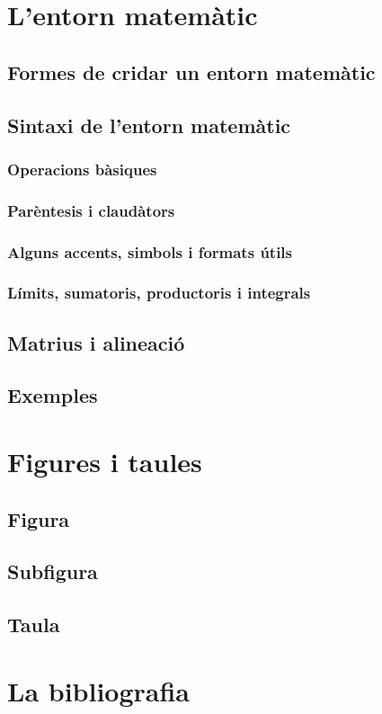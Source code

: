 \documentclass[15pt,twosides,onecolumn,openany]{book}
\begin{document}
\chapter{L'entorn matemàtic}
\section{Formes de cridar un entorn matemàtic}
\section{Sintaxi de l'entorn matemàtic}
\subsection{Operacions bàsiques}
\subsection{Parèntesis i claudàtors}
\subsection{Alguns accents, simbols i formats útils}
\subsection{Límits, sumatoris, productoris i integrals}
\section{Matrius i alineació}
\section{Exemples}

\chapter{Figures i taules}
\section{Figura}
\section{Subfigura}
\section{Taula}
\chapter{La bibliografia}
\end{document}
